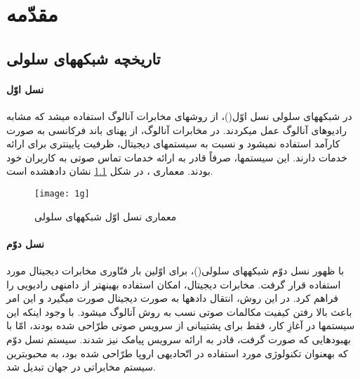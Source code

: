 \chapter{مقدّمه}
\label{fasleavval}
\label{history}
\section{تاریخچه شبکه\nf های سلولی}

\subsubsection{نسل اوّل}
در شبکه\nf های سلولی نسل اوّل()، از روش\nf های مخابرات آنالوگ استفاده می\nf شد  که مشابه رادیوهای آنالوگ عمل می\nf کردند. در مخابرات آنالوگ، از پهنای باند فرکانسی به صورت کارآمد استفاده نمی\nf شود و نسبت به سیستم\nf های دیجیتال، ظرفیت پایین\nf تری برای ارائه خدمات دارند. این سیستم\nf ها، صرفاً قادر به ارائه خدمات تماس صوتی به کاربران خود بودند. معماری ، در شکل \ref{1g} نشان داده\nf شده است\cite{cox}.

\begin{figure}[H]
\centering
\texttt{[image: 1g]}
\caption{معماری نسل اوّل شبکه\nf های سلولی}
\label{1g}
\end{figure}

\subsubsection{نسل دوّم}
   با ظهور نسل دوّم شبکه\nf های سلولی()، برای اوّلین بار فنّاوری مخابرات دیجیتال مورد استفاده قرار گرفت. مخابرات دیجیتال، امکان استفاده بهینه\nf تر از دامنه\nf ی رادیویی را فراهم کرد. در این روش، انتقال داده\nf ها به صورت دیجیتال صورت می\nf گیرد و این امر باعث بالا رفتن کیفیت مکالمات صوتی نسب به روش آنالوگ می\nf شود. با وجود این\nf که این سیستم\nf ها در آغازِ کار، فقط برای پشتیبانی از سرویس صوتی طرّاحی شده بودند، امّا با بهبودهایی که صورت گرفت، قادر به ارائه سرویس پیامک نیز شدند. سیستم نسل دوّم  که به\nf عنوان تکنولوژی مورد استفاده در اتّحادیه\nf ی اروپا طرّاحی شده بود، به محبوب\nf ترین سیستم مخابراتی در جهان تبدیل شد\cite{cox}.


